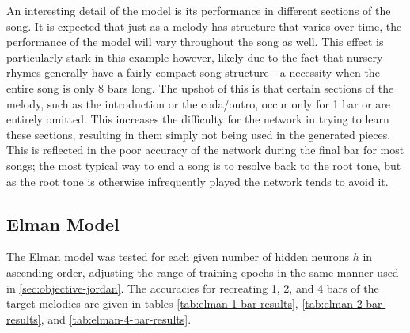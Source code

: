 \documentclass[ author={Stephen Livermore-Tozer},
				supervisor={Dr. Peter Flach},
				degree={MEng},
				title={Algorithmic Co-composition Using Machine Learning},
				subtitle={},
				type={research},
				year={2016} ]{dissertation}
\begin{document}
	An interesting detail of the model is its performance in different sections of the song. It is expected that just as a melody has structure that varies over time, the performance of the model will vary throughout the song as well. This effect is particularly stark in this example however, likely due to the fact that nursery rhymes generally have a fairly compact song structure - a necessity when the entire song is only 8 bars long. The upshot of this is that certain sections of the melody, such as the introduction or the coda/outro, occur only for 1 bar or are entirely omitted. This increases the difficulty for the network in trying to learn these sections, resulting in them simply not being used in the generated pieces. This is reflected in the poor accuracy of the network during the final bar for most songs; the most typical way to end a song is to resolve back to the root tone, but as the root tone is otherwise infrequently played the network tends to avoid it. 
	
	
	\subsection{Elman Model}
	
	The Elman model was tested for each given number of hidden neurons $h$ in ascending order, adjusting the range of training epochs in the same manner used in \ref{sec:objective-jordan}. The accuracies for recreating 1, 2, and 4 bars of the target melodies are given in tables \ref{tab:elman-1-bar-results}, \ref{tab:elman-2-bar-results}, and \ref{tab:elman-4-bar-results}.
	
\end{document}
